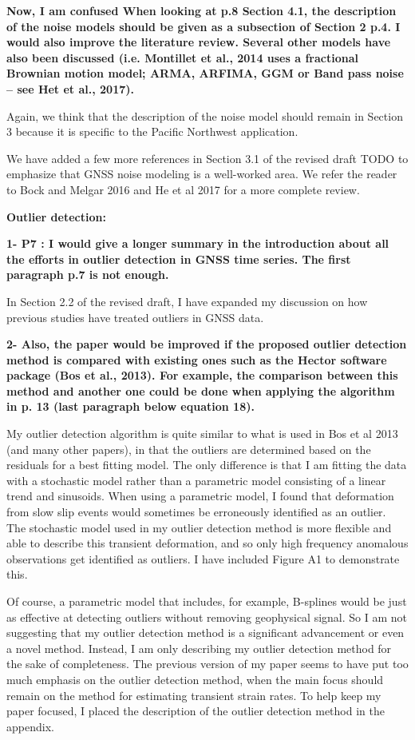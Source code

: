 \documentclass[10pt,a4paper]{letter}
\begin{document}
\begin{letter}{}
\textbf{Now, I am confused When looking at p.8 Section 4.1, the
description of the noise models should be given as a subsection of
Section 2 p.4. I would also improve the literature review. Several
other models have also been discussed (i.e. Montillet et al., 2014
uses a fractional Brownian motion model; ARMA, ARFIMA, GGM or Band
pass noise – see Het et al., 2017).}

Again, we think that the description of the noise model should remain
in Section 3 because it is specific to the Pacific Northwest
application. 

We have added a few more references in Section 3.1 of the revised
draft TODO to emphasize that GNSS noise modeling is a well-worked
area. We refer the reader to Bock and Melgar 2016 and He et al 2017
for a more complete review.

\textbf{Outlier detection:}

\textbf{1- P7 : I would give a longer summary in the introduction about all
the efforts in outlier detection in GNSS time series. The first
paragraph p.7 is not enough.}

In Section 2.2 of the revised draft, I have expanded my discussion on
how previous studies have treated outliers in GNSS data.

\textbf{2- Also, the paper would be improved if the proposed outlier detection
method is compared with existing ones such as the Hector software
package (Bos et al., 2013). For example, the comparison between this
method and another one could be done when applying the algorithm in p.
13 (last paragraph below equation 18).}

My outlier detection algorithm is quite similar to what is used in Bos
et al 2013 (and many other papers), in that the outliers are
determined based on the residuals for a best fitting model. The only
difference is that I am fitting the data with a stochastic model
rather than a parametric model consisting of a linear trend and
sinusoids. When using a parametric model, I found that deformation
from slow slip events would sometimes be erroneously identified as an
outlier. The stochastic model used in my outlier detection method is
more flexible and able to describe this transient deformation, and so
only high frequency anomalous observations get identified as outliers.
I have included Figure A1 to demonstrate this.

Of course, a parametric model that includes, for example, B-splines
would be just as effective at detecting outliers without removing
geophysical signal. So I am not suggesting that my outlier detection
method is a significant advancement or even a novel method. Instead, I
am only describing my outlier detection method for the sake of
completeness. The previous version of my paper seems to have put too
much emphasis on the outlier detection method, when the main focus
should remain on the method for estimating transient strain rates. To
help keep my paper focused, I placed the description of the outlier
detection method in the appendix.


\end{letter}
\end{document}
